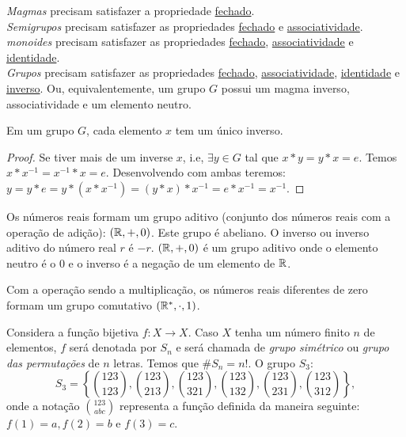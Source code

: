 \begin{definition}[Magma]
         \emph{Magmas} precisam satisfazer a propriedade \underline{fechado}.\\
         \emph{Semigrupos} precisam satisfazer as propriedades \underline{fechado} e \underline{associatividade}.\\
         \emph{monoides} precisam satisfazer as propriedades \underline{fechado}, \underline{associatividade} e \underline{identidade}.\\
         \emph{Grupos} precisam satisfazer as propriedades \underline{fechado}, \underline{associatividade}, \underline{identidade} e \underline{inverso}. Ou, equivalentemente, um grupo $G$ possui um magma inverso, associatividade e um elemento neutro.

         \begin{stat}
            Em um grupo $G$, cada elemento $x$ tem um único inverso.
            \begin{proof}
               Se tiver mais de um inverse $x$, i.e, $\exists y \in G$ tal que $x * y = y * x = e$. Temos $x * x^{-1} = x^{-1} * x = e$. Desenvolvendo com ambas teremos: $y = y * e = y * (x * x^{-1}) = (y * x) * x^{-1} = e * x^{-1} = x^{-1}.$
            \end{proof}
         \end{stat}
         \begin{exmp}
            Os números reais formam um grupo aditivo (conjunto dos números reais com a operação de adição): $(\mathbb{R},+,0)$. Este grupo é abeliano. O inverso ou inverso aditivo do número real $r$ é $-r$. $(\mathbb{R},+,0)$ é um grupo aditivo onde o elemento neutro é o $0$ e o inverso é a negação de um elemento de $\mathbb{R}$.
         \end{exmp}
         \begin{exmp}\label{NOTR}
            Com a operação sendo a multiplicação, os números reais diferentes de zero formam um grupo comutativo $(\mathbb{R}^{*},\cdot , 1)$.
         \end{exmp}
         \begin{exmp}
            Considera a função bijetiva $f: X \to X$. Caso $X$ tenha um número finito $n$ de elementos, $f$ será denotada por $S_{n}$ e será chamada de \emph{grupo simétrico} ou \emph{grupo das permutações} de $n$ letras. Temos que $\#S_{n} = n!$. O grupo $S_{3}$:
            $$S_{3} = \left\{\binom{123}{123}, \binom{123}{213}, \binom{123}{321}, \binom{123}{132}, \binom{123}{231}, \binom{123}{312}  \right\},$$
            onde a notação $\binom{123}{abc}$ representa a função definida da maneira seguinte: $f(1) = a, f(2) = b$ e $f(3) = c$.

\end{exmp}
\end{definition}
